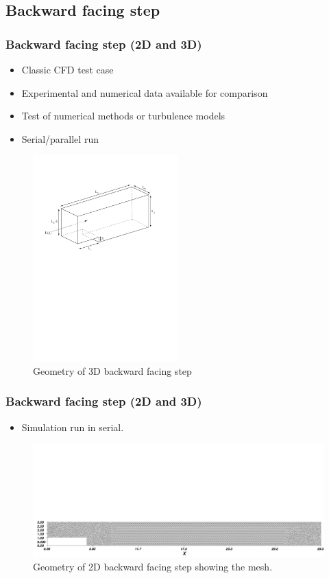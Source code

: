 \subsection{Backward facing step}

\begin{frame}
    \frametitle{Backward facing step (2D and 3D)}
\begin{itemize}
\item Classic CFD test case
\item Experimental and numerical data available for comparison
\item Test of numerical methods or turbulence models
\item Serial/parallel run
\end{itemize}
\begin{figure}
\centering
\includegraphics[width=0.5\textwidth]{./backward_facing_step/backward_facing_step_3d-schematic}
\caption{Geometry of 3D backward facing step}
\end{figure}
\end{frame}
%
\begin{frame}
    \frametitle{Backward facing step (2D and 3D)}
\begin{itemize}
\item Simulation run in serial.
\end{itemize}
\begin{figure}
\centering
\includegraphics[width=1.0\textwidth]{./backward_facing_step/backward_facing_step_2d-mesh}
\caption{Geometry of 2D backward facing step showing the mesh.}
\end{figure}
\end{frame}
